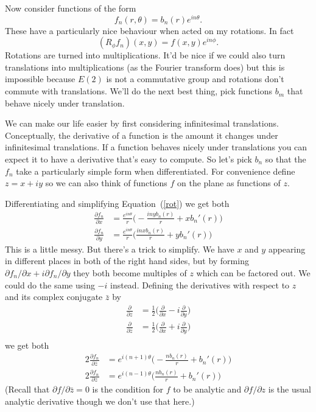 \documentclass{article}
\begin{document}
Now consider functions of the form
\begin{equation}
f_n(r,\theta)=b_n(r)e^{in\theta}. \label{rot}
\end{equation}
These have a particularly nice behaviour when acted on my rotations.
In fact
\[
(R_\phi f_n)(x,y) = f(x,y)e^{in\phi}.
\]
Rotations are turned into multiplications.
It'd be nice if we could also turn translations into multiplications (as the Fourier transform does) but this is impossible because $E(2)$ is not a commutative group and rotations don't commute with translations.
We'll do the next best thing, pick functions $b_m$ that behave nicely under translation.

We can make our life easier by first considering infinitesimal translations.
Conceptually, the derivative of a function is the amount it changes under infinitesimal translations.
If a function behaves nicely under translations you can expect it to have a derivative that's easy to compute.
So let's pick $b_n$ so that the $f_n$ take a particularly simple form when differentiated.
For convenience define $z=x+iy$ so we can also think of functions $f$ on the plane as functions of $z$.

Differentiating and simplifying Equation~(\ref{rot}) we get both
\begin{align}
\frac{\partial f_n}{\partial x} &= 
    \frac{e^{in\theta}}{r}\Big(-\frac{inyb_n(r)}{r}+xb_n'(r)\Big) \label{partialx}\\
\frac{\partial f_n}{\partial y} &= 
    \frac{e^{in\theta}}{r}\Big(\frac{inxb_n(r)}{r}+yb_n'(r)\Big) \label{partialy}
\end{align}
This is a little messy.
But there's a trick to simplify.
We have $x$ and $y$ appearing in different places in both of the right hand sides, but by forming $\partial f_n/\partial x+i\partial f_n/\partial y$ they both become multiples of $z$ which can be factored out.
We could do the same using $-i$ instead.
Defining the derivatives with respect to $z$ and its complex conjugate $\bar{z}$ by
\begin{align*}
\frac{\partial}{\partial z} &= \frac{1}{2}\Big(\frac{\partial}{\partial x}-i\frac{\partial}{\partial y}\Big)\\
\frac{\partial}{\partial\bar{z}} &= \frac{1}{2}\Big(\frac{\partial}{\partial x}+i\frac{\partial}{\partial y}\Big)\\
\end{align*}
we get both
\begin{align*}
2\frac{\partial f_n}{\partial\bar{z}} & = e^{i(n+1)\theta}
    \Big(-\frac{nb_n(r)}{r}+b_n'(r)\Big)\\
2\frac{\partial f_n}{\partial z} & = e^{i(n-1)\theta}
    \Big(\frac{nb_n(r)}{r}+b_n'(r)\Big)
\end{align*}
(Recall that $\partial f/\partial\bar{z}=0$ is the condition for $f$ to be analytic and $\partial f/\partial z$ is the usual analytic derivative though we don't use that here.)
\end{document}
